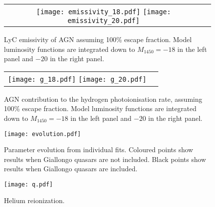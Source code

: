 \documentclass[a4paper,fleqn,usenatbib]{mnras}
\begin{document}

\begin{figure*}
  \begin{center}
    \begin{tabular}{cc}
    \texttt{[image: emissivity\_18.pdf]}
    \texttt{[image: emissivity\_20.pdf]}
    \end{tabular}
  \end{center}
  \caption{LyC emissivity of AGN assuming 100\% escape fraction.
    Model luminosity functions are integrated down to $M_{1450}=-18$
    in the left panel and $-20$ in the right panel.}
  \label{fig:gammapi}
\end{figure*}

\begin{figure*}
  \begin{center}
    \begin{tabular}{cc}
    \texttt{[image: g\_18.pdf]}
    \texttt{[image: g\_20.pdf]}
    \end{tabular}
  \end{center}
  \caption{AGN contribution to the hydrogen photoionisation rate,
    assuming 100\% escape fraction.  Model luminosity functions are
    integrated down to $M_{1450}=-18$ in the left panel and $-20$ in
    the right panel.}
  \label{fig:gammapi}
\end{figure*}

\begin{figure*}
  \begin{center}
    \texttt{[image: evolution.pdf]}
  \end{center}
  \caption{Parameter evolution from individual fits.  Coloured points
    show results when Giallongo quasars are not included.  Black
    points show results when Giallongo quasars are included.}
\end{figure*}

\begin{figure*}
  \begin{center}
    \texttt{[image: q.pdf]}
  \end{center}
  \caption{Helium reionization.}
\end{figure*}
\end{document}
